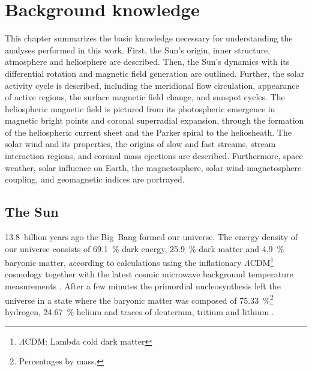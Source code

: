 \chapter{Background knowledge}
\label{chap:basics}
This chapter summarizes the basic knowledge necessary for understanding the analyses performed in this work. First, the Sun's origin, inner structure, atmosphere and heliosphere are described. Then, the Sun's dynamics with its differential rotation and magnetic field generation are outlined. Further, the solar activity cycle is described, including the meridional flow circulation, appearance of active regions, the surface magnetic field change, and sunspot cycles. The heliospheric magnetic field is pictured from its photospheric emergence in magnetic bright points and coronal superradial expansion, through the formation of the heliospheric current sheet and the Parker spiral to the heliosheath. The solar wind and its properties, the origins of slow and fast streams, stream interaction regions, and coronal mass ejections are described. Furthermore, space weather, solar influence on Earth, the magnetosphere, solar wind-magnetosphere coupling, and geomagnetic indices are portrayed.


\section{The Sun}
\label{sec:solar_composition}

13.8~billion years ago the Big~Bang formed our universe. The energy density of our universe consists of \SI{69.1}{\percent} dark energy, \SI{25.9}{\percent} dark matter and \SI{4.9}{\percent} baryonic matter, according to calculations using the inflationary $\Lambda$CDM\footnote{$\Lambda$CDM: Lambda cold dark matter} cosmology together with the latest cosmic microwave background temperature measurements \citep{Planck2016}.
After a few minutes the primordial nucleosynthesis left the universe in a state where the baryonic matter was composed of \SI{75.33}{\percent}\footnote{Percentages by mass.} hydrogen, \SI{24.67}{\percent} helium and traces of deuterium, tritium and lithium \citep{Planck2016}.

